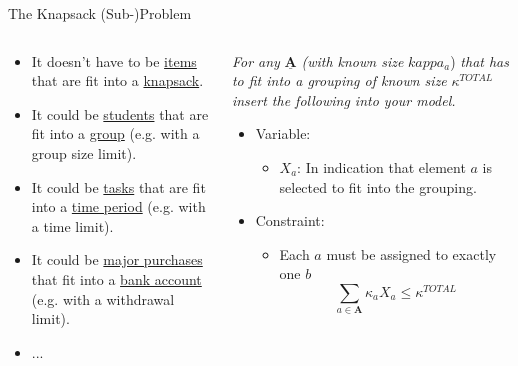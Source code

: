\documentclass[10pt, aspectratio=169]{beamer}
\begin{document}
\begin{frame}{The Knapsack (Sub-)Problem}
    \begin{columns}
        \begin{column}{0.5\textwidth}
            \begin{itemize}
                \item It doesn't have to be \underline{items} that are fit into a \underline{knapsack}.
                \item It could be \underline{students} that are fit into a \underline{group} (e.g. with a group size limit).
                \item It could be \underline{tasks} that are fit into a \underline{time period} (e.g. with a time limit).
                \item It could be \underline{major purchases} that fit into a \underline{bank account} (e.g. with a withdrawal limit).
                \item ...
            \end{itemize}
        \end{column}
        \begin{column}{0.5\textwidth}
            \begin{center}
                \textit{For any} $\underline{\textbf{A}}$ \textit{(with known size }$kappa_a$)\textit{ that has to fit into a grouping of known size} $\kappa^{TOTAL}$ \textit{insert the following into your model.}
            \end{center}
            \begin{itemize}
                \item Variable:
                \begin{itemize}
                    \item $X_{a}$: In indication that element $a$ is selected to fit into the grouping.
                \end{itemize}
                \item Constraint:
                \begin{itemize}
                    \item Each $a$ must be assigned to exactly one $b$
                    $$\sum_{a \in \textbf{A}} \kappa_a X_{a} \leq \kappa^{TOTAL}$$
                \end{itemize}
            \end{itemize}
        \end{column}
    \end{columns}
\end{frame}
\end{document}
